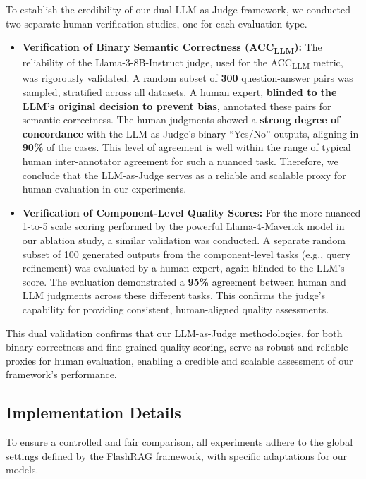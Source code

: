 \documentclass[11pt]{article}
\begin{document}
To establish the credibility of our dual LLM-as-Judge framework, we conducted two separate human verification studies, one for each evaluation type.

\begin{itemize}
    \item \textbf{Verification of Binary Semantic Correctness (ACC\textsubscript{LLM}):} The reliability of the Llama-3-8B-Instruct judge, used for the ACC\textsubscript{LLM} metric, was rigorously validated. A random subset of \textbf{300} question-answer pairs was sampled, stratified across all datasets. A human expert, \textbf{blinded to the LLM's original decision to prevent bias}, annotated these pairs for semantic correctness. The human judgments showed a \textbf{strong degree of concordance} with the LLM-as-Judge's binary ``Yes/No'' outputs, aligning in \textbf{90\%} of the cases. This level of agreement is well within the range of typical human inter-annotator agreement for such a nuanced task. Therefore, we conclude that the LLM-as-Judge serves as a reliable and scalable proxy for human evaluation in our experiments.
    
    \item \textbf{Verification of Component-Level Quality Scores:} For the more nuanced 1-to-5 scale scoring performed by the powerful Llama-4-Maverick model in our ablation study, a similar validation was conducted. A separate random subset of 100 generated outputs from the component-level tasks (e.g., query refinement) was evaluated by a human expert, again blinded to the LLM's score. The evaluation demonstrated a \textbf{95\%} agreement between human and LLM judgments across these different tasks. This confirms the judge's capability for providing consistent, human-aligned quality assessments.
\end{itemize}

This dual validation confirms that our LLM-as-Judge methodologies, for both binary correctness and fine-grained quality scoring, serve as robust and reliable proxies for human evaluation, enabling a credible and scalable assessment of our framework's performance.

\subsection{Implementation Details}

To ensure a controlled and fair comparison, all experiments adhere to the global settings defined by the FlashRAG framework, with specific adaptations for our models.
\end{document}
